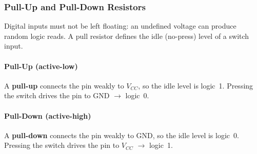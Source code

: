 \subsubsection{Pull-Up and Pull-Down Resistors}
\label{sec:pull-resistors}

Digital inputs must not be left floating: an undefined voltage can produce random logic reads. A pull resistor defines the idle (no-press) level of a switch input.

\paragraph{Pull-Up (active-low)}
A \textbf{pull-up} connects the pin weakly to $V_{CC}$, so the idle level is logic~1. Pressing the switch drives the pin to GND $\rightarrow$ logic~0.

\paragraph{Pull-Down (active-high)}
A \textbf{pull-down} connects the pin weakly to GND, so the idle level is logic~0. Pressing the switch drives the pin to $V_{CC}$ $\rightarrow$ logic~1.


